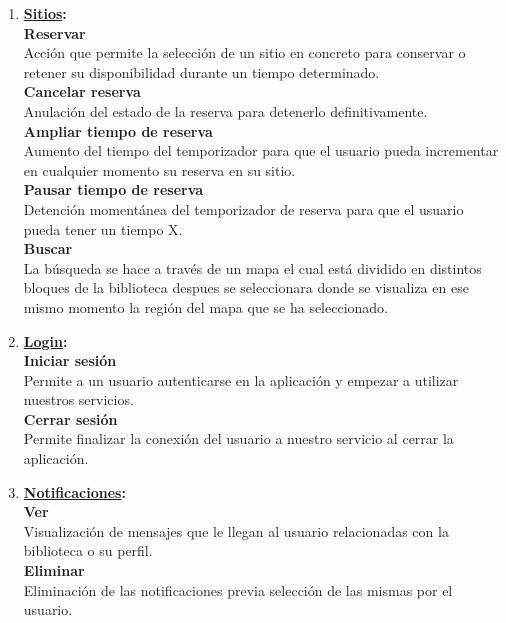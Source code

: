 \documentclass[12pt]{article}
\begin{document}
\begin{enumerate}

\item \textbf{\underline{Sitios}:}\\
\textbf{Reservar}\\
Acción que permite la selección de un sitio en concreto para conservar o retener su disponibilidad durante un tiempo determinado.\\
\textbf{Cancelar reserva}\\
Anulación del estado de la reserva para detenerlo definitivamente. \\
\textbf{Ampliar tiempo de reserva}\\
Aumento del tiempo del temporizador para que el usuario pueda incrementar en cualquier momento su reserva en su sitio.\\
\textbf{Pausar tiempo de reserva}\\
Detención momentánea del temporizador de reserva para que el usuario pueda tener un tiempo X.\\
\textbf{Buscar}\\
La búsqueda se hace a través de un mapa el cual está dividido en distintos bloques de la biblioteca despues se seleccionara donde se visualiza en ese mismo momento la región del mapa que se ha seleccionado.         

\item \textbf{\underline{Login}:}\\
\textbf{Iniciar sesión}\\
Permite a un usuario autenticarse en la aplicación y empezar a utilizar nuestros servicios.\\
\textbf{Cerrar sesión}\\
Permite finalizar la conexión del usuario a nuestro servicio al cerrar la aplicación.\\
    
\item \textbf{\underline{Notificaciones}:}\\
\textbf{Ver }\\
Visualización de mensajes que le llegan al usuario relacionadas con la biblioteca o su perfil.\\
\textbf{Eliminar }\\
Eliminación de las notificaciones previa selección de las mismas por el usuario.\\


\end{enumerate}
\end{document}
